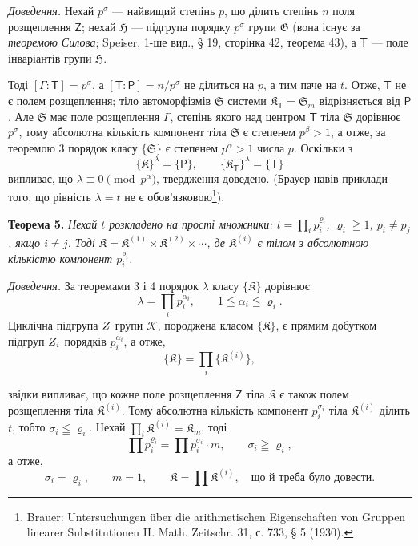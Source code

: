 \documentclass[11pt]{article}
\newcommand{\srcfn}[2]{\footnote{#2}}
\begin{document}
\emph{Доведення.} Нехай \(p^\sigma\) --- найвищий степінь \(p\), що ділить степінь \(n\) поля розщеплення \(\mathsf{Z}\); нехай \(\mathfrak H\) --- підгрупа порядку \(p^\sigma\) групи \(\mathfrak G\) (вона існує за \emph{теоремою Силова}; Speiser, 1-ше вид., § 19, сторінка 42, теорема 43), а \(\mathsf{T}\) --- поле інваріантів групи \(\mathfrak H\).

Тоді \([\Gamma:\mathsf{T}]=p^\sigma\), а \([\mathsf{T}:\mathsf P]=n/p^\sigma\) не ділиться на \(p\), а тим паче на \(t\). Отже, \(\mathsf{T}\) не є полем розщеплення; тіло автоморфізмів \(\mathfrak S\) системи \(\mathfrak K_{\mathsf{T}}=\mathfrak S_m\) відрізняється від \(\mathsf P\). Але \(\mathfrak S\) має поле розщеплення \(\Gamma\), степінь якого над центром \(\mathsf{T}\) тіла \(\mathfrak S\) дорівнює \(p^\sigma\), тому абсолютна кількість компонент тіла \(\mathfrak S\) є степенем \(p^\beta>1\), а отже, за теоремою 3 порядок класу \(\{\mathfrak S\}\) є степенем \(p^\alpha>1\) числа \(p\). Оскільки з
\[
\{\mathfrak K\}^{\lambda}=\{\mathsf P\},
\qquad
\{\mathfrak K_{\mathsf{T}}\}^{\lambda}=\{\mathsf{T}\}
\]
випливає, що \(\lambda\equiv0\pmod {p^\alpha}\), твердження доведено. (Брауер навів приклади того, що рівність \(\lambda=t\) не є обов'язковою\srcfn{1}{Brauer: Untersuchungen über die arithmetischen Eigenschaften von Gruppen linearer Substitutionen II. Math. Zeitschr. 31, с. 733, § 5 (1930).}).

\textbf{Теорема 5.} \emph{Нехай \(t\) розкладено на прості множники: \(t=\prod_i p_i^{\varrho_i}\), \(\varrho_i\geqq1\), \(p_i\ne p_j\), якщо \(i\ne j\). Тоді \(\mathfrak K=\mathfrak K^{(1)}\times\mathfrak K^{(2)}\times\cdots\), де \(\mathfrak K^{(i)}\) є тілом з абсолютною кількістю компонент \(p_i^{\varrho_i}\).}

\emph{Доведення.} За теоремами 3 і 4 порядок \(\lambda\) класу \(\{\mathfrak K\}\) дорівнює
\[
\lambda=\prod_i p_i^{\alpha_i},\qquad 1\leqq\alpha_i\leqq\varrho_i.
\]
Циклічна підгрупа \(\mathscr \mathsf{Z}\) групи \(\mathscr K\), породжена класом \(\{\mathfrak K\}\), є прямим добутком підгруп \(\mathscr \mathsf{Z}_i\) порядків \(p_i^{\alpha_i}\), а отже,
\[
\{\mathfrak K\}=\prod_i\{\mathfrak K^{(i)}\},
\]

звідки випливає, що кожне поле розщеплення \(\mathsf{Z}\) тіла \(\mathfrak K\) є також полем розщеплення тіла \(\mathfrak K^{(i)}\). Тому абсолютна кількість компонент \(p_i^{\sigma_i}\) тіла \(\mathfrak K^{(i)}\) ділить \(t\), тобто \(\sigma_i\leqq\varrho_i\). Нехай \(\prod_i \mathfrak K^{(i)}=\mathfrak K_m\), тоді
\[
\prod p_i^{\varrho_i}=\prod p_i^{\sigma_i}\cdot m,
\qquad
\sigma_i\geqq\varrho_i,
\]
а отже,
\[
\sigma_i=\varrho_i,\qquad m=1,\qquad
\mathfrak K=\prod \mathfrak K^{(i)},
\quad\text{що й треба було довести.}
\]
\end{document}
